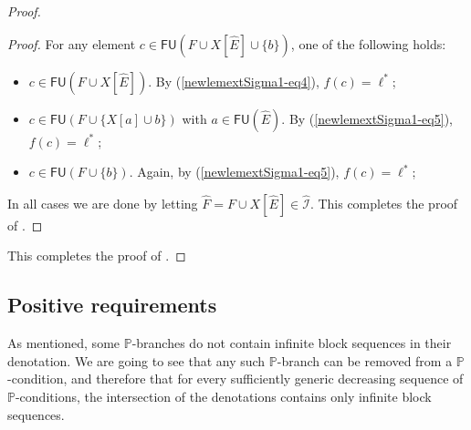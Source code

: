 \documentclass[10pt,a4paper]{article}
\def\PP{\mathbb{P}}
\def\I{\mathcal{I}}
\newcommand{\FU}[0]{\mathsf{FU}} %
\def\h#1{\hat{#1}}
\numberwithin{theorem}{section}
\begin{document}
\begin{proof}
\begin{proof}
For any element $c \in \FU(F \cup X[\h E] \cup \{b\})$, one of the following holds:
\begin{itemize}
    \item[(i)] $c \in \FU(F \cup X[\h E])$. By (\ref{newlemextSigma1-eq4}), $f(c) = \ell^*$;
    \item[(ii)] $c \in \FU(F \cup \{X[a] \cup b\})$ with $a \in \FU(\h E)$. By (\ref{newlemextSigma1-eq5}), $f(c) = \ell^*$;
    \item[(iii)] $c \in \FU(F \cup \{b\})$. Again, by (\ref{newlemextSigma1-eq5}), $f(c) = \ell^*$;
\end{itemize}
In all cases we are done by letting $\hat F = F \cup X[\h E] \in \h \I$.
This completes the proof of .
\end{proof}
This completes the proof of .
\end{proof}

\subsection{Positive requirements}

As mentioned, some $\PP$-branches do not contain infinite block sequences in their denotation.
We are going to see that any such $\PP$-branch can be removed from a $\PP$-condition, and therefore that for every sufficiently generic decreasing sequence of $\PP$-conditions, the intersection of the denotations contains only infinite block sequences.
\end{document}
